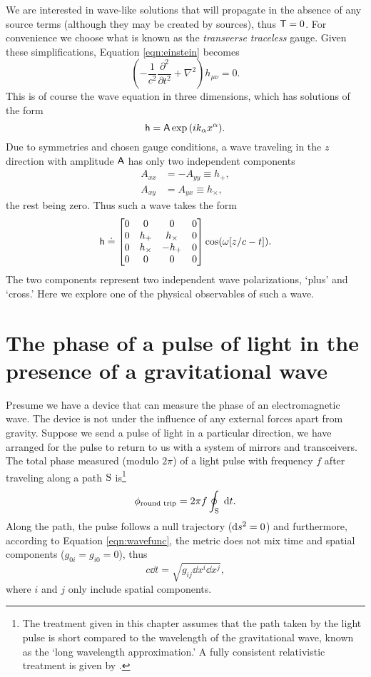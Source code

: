 We are interested in wave-like solutions that will propagate in the absence of any source terms (although they may be created by sources), thus $\mathsf{T}=0$. %
For convenience we choose what is known as the \emph{transverse traceless} gauge. %
Given these simplifications, Equation \ref{eqn:einstein} becomes
\begin{equation}
\left(-\frac{1}{c^2}\frac{\partial^2}{\partial t^2}+\nabla^2\right)h_{\mu \nu}=0.
\end{equation}
This is of course the wave equation in three dimensions, which has solutions of the form
\begin{equation}
\mathsf{h}=\mathsf{A}\exp{(ik_\alpha x^\alpha)}.
\end{equation}
Due to symmetries and chosen gauge conditions, a wave traveling in the $z$ direction with amplitude $\mathsf{A}$ has only two independent components \cite[Chap. %
9]{schutz1985first}
\begin{align*}
A_{xx}&=-A_{yy}\equiv h_+,\\
A_{xy}&=A_{yx}\equiv h_\times,
\end{align*}
the rest being zero. %
Thus such a wave takes the form
\begin{equation}
\label{eqn:wavefunc}
\mathsf{h} \doteq 
\left[\begin{matrix}
0 & 0 & 0 & 0 \\
0 & h_+ & h_\times & 0 \\
0 & h_\times & -h_+ & 0 \\
0 & 0 & 0 & 0
\end{matrix}\right]
\cos(\omega [z/c- t]).
\end{equation}
The two components represent two independent wave polarizations, `plus' and `cross.' Here we explore one of the physical observables of such a wave.

\section{The phase of a pulse of light in the presence of a gravitational wave}
Presume we have a device that can measure the phase of an electromagnetic wave. %
The device is not under the influence of any external forces apart from gravity. %
Suppose we send a pulse of light in a particular direction, we have arranged for the pulse to return to us with a system of mirrors and transceivers. %
The total phase measured (modulo $2\pi$) of a light pulse with frequency $f$ after traveling along a path $\rm S$ is\footnote{The treatment given in this chapter assumes that the path taken by the light pulse is short compared to the wavelength of the gravitational wave, known as the `long wavelength approximation.' A fully consistent relativistic treatment is given by \citet{RakhmanovPhoton}.}
\begin{equation}
\phi_{\text{round trip}} = 2\pi f\oint_{\rm S} \; \mathrm{d} t.
\end{equation}
Along the path, the pulse follows a null trajectory ($\mathrm{d} s^2=0$) and furthermore, according to Equation \ref{eqn:wavefunc}, the metric does not mix time and spatial components ($g_{0i}=g_{i0}=0$), thus
\begin{equation}
c\dd t = \sqrt{g_{ij}\dd x^i \dd x^j},
\end{equation}
where $i$ and $j$ only include spatial components.

